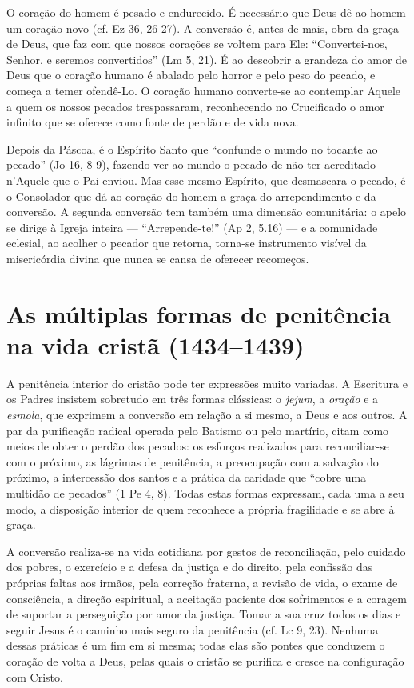 O coração do homem é pesado e endurecido. É necessário que Deus dê ao homem um coração novo (cf. Ez 36, 26-27). A conversão é, antes de mais, obra da graça de Deus, que faz com que nossos corações se voltem para Ele: ``Convertei-nos, Senhor, e seremos convertidos'' (Lm 5, 21). É ao descobrir a grandeza do amor de Deus que o coração humano é abalado pelo horror e pelo peso do pecado, e começa a temer ofendê-Lo. O coração humano converte-se ao contemplar Aquele a quem os nossos pecados trespassaram, reconhecendo no Crucificado o amor infinito que se oferece como fonte de perdão e de vida nova.

Depois da Páscoa, é o Espírito Santo que ``confunde o mundo no tocante ao pecado'' (Jo 16, 8-9), fazendo ver ao mundo o pecado de não ter acreditado n'Aquele que o Pai enviou. Mas esse mesmo Espírito, que desmascara o pecado, é o Consolador que dá ao coração do homem a graça do arrependimento e da conversão. A segunda conversão tem também uma dimensão comunitária: o apelo se dirige à Igreja inteira --- ``Arrepende-te!'' (Ap 2, 5.16) --- e a comunidade eclesial, ao acolher o pecador que retorna, torna-se instrumento visível da misericórdia divina que nunca se cansa de oferecer recomeços.

\section{As múltiplas formas de penitência na vida cristã (1434--1439)}

A penitência interior do cristão pode ter expressões muito variadas. A Escritura e os Padres insistem sobretudo em três formas clássicas: o \emph{jejum}, a \emph{oração} e a \emph{esmola}, que exprimem a conversão em relação a si mesmo, a Deus e aos outros. A par da purificação radical operada pelo Batismo ou pelo martírio, citam como meios de obter o perdão dos pecados: os esforços realizados para reconciliar-se com o próximo, as lágrimas de penitência, a preocupação com a salvação do próximo, a intercessão dos santos e a prática da caridade que ``cobre uma multidão de pecados'' (1 Pe 4, 8). Todas estas formas expressam, cada uma a seu modo, a disposição interior de quem reconhece a própria fragilidade e se abre à graça.

A conversão realiza-se na vida cotidiana por gestos de reconciliação, pelo cuidado dos pobres, o exercício e a defesa da justiça e do direito, pela confissão das próprias faltas aos irmãos, pela correção fraterna, a revisão de vida, o exame de consciência, a direção espiritual, a aceitação paciente dos sofrimentos e a coragem de suportar a perseguição por amor da justiça. Tomar a sua cruz todos os dias e seguir Jesus é o caminho mais seguro da penitência (cf. Lc 9, 23). Nenhuma dessas práticas é um fim em si mesma; todas elas são pontes que conduzem o coração de volta a Deus, pelas quais o cristão se purifica e cresce na configuração com Cristo.

